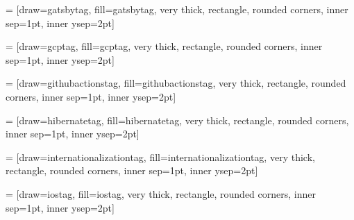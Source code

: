  = [draw=gatsbytag, fill=gatsbytag, very thick, rectangle, rounded corners, inner sep=1pt, inner ysep=2pt]
\newcommand{\gatsbytag}{\begin{tikzpicture}\node [gatsbytag] (box){{\scriptsize \color{white}{\textbf{\phantom{|}Gatsby\phantom{|}}}}};\end{tikzpicture}}
\usepackage{tikz}
    
 = [draw=gcptag, fill=gcptag, very thick, rectangle, rounded corners, inner sep=1pt, inner ysep=2pt]
\newcommand{\gcptag}{\begin{tikzpicture}\node [gcptag] (box){{\scriptsize \color{white}{\textbf{\phantom{|}GCP\phantom{|}}}}};\end{tikzpicture}}
\usepackage{tikz}
    
 = [draw=githubactionstag, fill=githubactionstag, very thick, rectangle, rounded corners, inner sep=1pt, inner ysep=2pt]
\newcommand{\githubactionstag}{\begin{tikzpicture}\node [githubactionstag] (box){{\scriptsize \textbf{\phantom{|}Github Actions\phantom{|}}}};\end{tikzpicture}}
\usepackage{tikz}
    
 = [draw=hibernatetag, fill=hibernatetag, very thick, rectangle, rounded corners, inner sep=1pt, inner ysep=2pt]
\newcommand{\hibernatetag}{\begin{tikzpicture}\node [hibernatetag] (box){{\scriptsize \textbf{\phantom{|}Hibernate\phantom{|}}}};\end{tikzpicture}}
\usepackage{tikz}
    
 = [draw=internationalizationtag, fill=internationalizationtag, very thick, rectangle, rounded corners, inner sep=1pt, inner ysep=2pt]
\newcommand{\internationalizationtag}{\begin{tikzpicture}\node [internationalizationtag] (box){{\scriptsize \color{white}{\textbf{\phantom{|}i18n\phantom{|}}}}};\end{tikzpicture}}
\usepackage{tikz}
    
 = [draw=iostag, fill=iostag, very thick, rectangle, rounded corners, inner sep=1pt, inner ysep=2pt]
\newcommand{\iostag}{\begin{tikzpicture}\node [iostag] (box){{\scriptsize \textbf{\phantom{|}iOS\phantom{|}}}};\end{tikzpicture}}
\usepackage{tikz}
    
